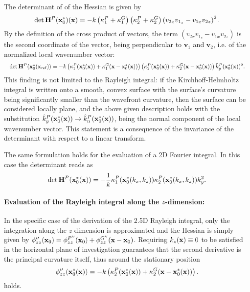 The determinant of of the Hessian is given by
\begin{equation}
\mathrm{det} \, \mathbf{H}^P(\mathbf{x}_0^*)(\mathbf{x})  = -k \left( \kappa_1^P+\kappa_1^G \right) \left( \kappa_2^P+\kappa_2^G \right) \left( v_{2 x} v_{1_z} - v_{1 x} v_{2 z} \right)^2.
\end{equation}
By the definition of the cross product of vectors, the term $\left( v_{2 x} v_{1_z} - v_{1 x} v_{2 z} \right)$ is the second coordinate of the vector, being perpendicular to $\mathbf{v}_1$ and $\mathbf{v}_2$, i.e. of the normalized local wavenumber vector:
\begin{equation}
\resizebox{1\hsize}{!}{$
\mathrm{det} \, \mH^P(\vxo^*(\vxref))  = -k \left( \kappa_1^P(\vxo^*(\vx))+\kappa_1^G(\vx-\vxo^*(\vx)) \right) \left( \kappa_2^P(\vxo^*(\vx))+\kappa_2^G(\vx-\vxo^*(\vx)) \right) \hat{k}_y^P(\vxo^*(\vx))^2. $}
\end{equation}
This finding is not limited to the Rayleigh integral: if the Kirchhoff-Helmholtz integral is written onto a smooth, convex surface with the surface's curvature being significantly smaller than the wavefront curvature, then the surface can be considered locally plane, and the above given description holds with the substitution $\hat{k}_y^P(\mathbf{x}_0^*(\mathbf{x})) \rightarrow \hat{k}_{\mathrm{n}}^P(\mathbf{x}_0^*(\mathbf{x}))$, being the normal component of the local wavenumber vector.
This statement is a consequence of the invariance of the determinant with respect to a linear transform.
	
The same formulation holds for the evaluation of a 2D Fourier integral.
In this case the determinant reads as
\begin{equation}
\mathrm{det} \, \mathbf{H}^P(\mathbf{x}_0^*(\mathbf{x}))  = -\frac{1}{k} \kappa_1^P(\mathbf{x}_0^*(k_x,k_z)) \kappa_2^P(\mathbf{x}_0^*(k_x,k_z	)) k_y^2.
\end{equation}


\paragraph{Evaluation of the Rayleigh integral along the $z$-dimension:}
In the specific case of the derivation of the 2.5D Rayleigh integral, only the integration along the $z$-dimension is approximated and the Hessian is simply given by $\phi''_{zz}(\mathbf{x}_0) =\phi^{P''}_{zz}(\mathbf{x}_0) + \phi^{G''}_{zz}(\mathbf{x}-\mathbf{x}_0)$.
Requiring $k_z(\mathbf{x}) \equiv 0$ to be satisfied in the horizontal plane of investigation guarantees that the second derivative is the principal curvature itself, thus around the stationary position
\begin{equation}
\phi''_{zz}(\mathbf{x}_0^*(\mathbf{x})) = -k \left( \kappa_2^P(\mathbf{x}_0^*(\mathbf{x})) + \kappa_2^G(\mathbf{x}-\mathbf{x}_0^*(\mathbf{x})) \right).
\end{equation}
holds.